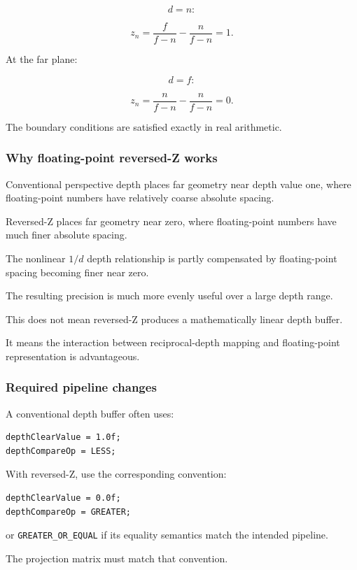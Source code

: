\[
 d=n:
\]

\[
 z_n= \frac f{f-n}-\frac n{f-n}=1.
\]

At the far plane:

\[
 d=f:
\]

\[
 z_n= \frac n{f-n}-\frac n{f-n}=0.
\]

The boundary conditions are satisfied exactly in real arithmetic.

\subsubsection{Why floating-point reversed-Z works}\label{why-floating-point-reversed-z-works}

Conventional perspective depth places far geometry near depth value one, where floating-point numbers have relatively coarse absolute spacing.

Reversed-Z places far geometry near zero, where floating-point numbers have much finer absolute spacing.

The nonlinear \(1/d\) depth relationship is partly compensated by floating-point spacing becoming finer near zero.

The resulting precision is much more evenly useful over a large depth range.

This does not mean reversed-Z produces a mathematically linear depth buffer.

It means the interaction between reciprocal-depth mapping and floating-point representation is advantageous.

\subsubsection{Required pipeline changes}\label{required-pipeline-changes}

A conventional depth buffer often uses:

\begin{verbatim}
depthClearValue = 1.0f;
depthCompareOp = LESS;
\end{verbatim}

With reversed-Z, use the corresponding convention:

\begin{verbatim}
depthClearValue = 0.0f;
depthCompareOp = GREATER;
\end{verbatim}

or \texttt{GREATER\_OR\_EQUAL} if its equality semantics match the intended pipeline.

The projection matrix must match that convention.

